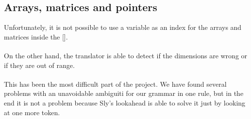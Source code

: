 \documentclass[]{article}
\begin{document}
        \subsection{Arrays, matrices and pointers}
        Unfortunately, it is not possible to use a variable as an index for the arrays and matrices inside the []. \\\\On the other hand, the translator is able to detect if the dimensions are wrong or if they are out of range. \\\\ This has been the most difficult part of the project. We have found several problems with an unavoidable ambiguiti for our grammar in one rule, but in the end it is not a problem because Sly's lookahead is able to solve it just by looking at one more token. \\\\
\end{document}
